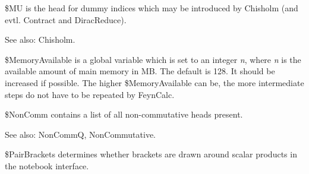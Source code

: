 
\${}MU is the head for dummy indices which may be introduced by Chisholm (and evtl. Contract and DiracReduce).

\dispSFinmath{
{{\gamma }^{\mu }}\multsp {{\gamma }^{\nu }}
}


See also:  Chisholm.



\${}MemoryAvailable is { }a global variable which is set to an integer {\itshape n}, where {\itshape n} is the available amount of main memory in
MB. The default is 128. It should be increased if possible. The higher \${}MemoryAvailable can
  be, the more intermediate steps do not have to be repeated by FeynCalc.





\${}NonComm contains a list of all non-commutative heads present.



See also:  NonCommQ, NonCommutative.



\${}PairBrackets determines whether brackets are drawn around scalar products in the notebook interface.


\dispSFoutmath{
\&
}








